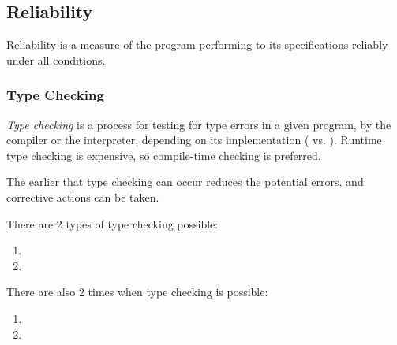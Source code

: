 \subsection{Reliability}\label{subsec:Reliability}
Reliability is a measure of the program performing to its specifications reliably under all conditions.

\subsubsection{Type Checking}\label{subsubsec:Type_Checking}
\begin{definition}\label{def:Type_Checking}
  \emph{Type checking} is a process for testing for type errors in a given program, by the compiler or the interpreter, depending on its implementation ( vs. ).
  Runtime type checking is expensive, so compile-time checking is preferred.

  \begin{remark}
    The earlier that type checking can occur reduces the potential errors, and corrective actions can be taken.
  \end{remark}

  There are 2 types of type checking possible:
  \begin{enumerate}[noitemsep]
  \item {}
  \item {}
  \end{enumerate}

  There are also 2 times when type checking is possible:
  \begin{enumerate}[noitemsep]
  \item {}
  \item {}
  \end{enumerate}
\end{definition}

